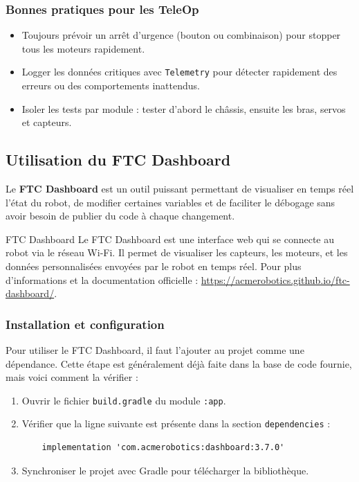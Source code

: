 \documentclass[12pt, a4paper]{report}
\begin{document}
    \subsubsection*{Bonnes pratiques pour les TeleOp}

    \begin{itemize}
        \item Toujours prévoir un arrêt d’urgence (bouton ou combinaison) pour stopper tous les moteurs rapidement.
        \item Logger les données critiques avec \texttt{Telemetry} pour détecter rapidement des erreurs ou des comportements inattendus.
        \item Isoler les tests par module : tester d’abord le châssis, ensuite les bras, servos et capteurs.
    \end{itemize}

    \subsection{Utilisation du FTC Dashboard}

    Le \textbf{FTC Dashboard} est un outil puissant permettant de visualiser en temps réel l'état du robot, de modifier certaines variables et de faciliter le débogage sans avoir besoin de publier du code à chaque changement.

    \begin{mydefinition}{FTC Dashboard}
        Le FTC Dashboard est une interface web qui se connecte au robot via le réseau Wi-Fi. Il permet de visualiser les capteurs, les moteurs, et les données personnalisées envoyées par le robot en temps réel.
        Pour plus d'informations et la documentation officielle : \url{https://acmerobotics.github.io/ftc-dashboard/}.
    \end{mydefinition}

    \subsubsection{Installation et configuration}

    Pour utiliser le FTC Dashboard, il faut l'ajouter au projet comme une dépendance. Cette étape est généralement déjà faite dans la base de code fournie, mais voici comment la vérifier :

    \begin{enumerate}
        \item Ouvrir le fichier \verb|build.gradle| du module \verb|:app|.
        \item Vérifier que la ligne suivante est présente dans la section \verb|dependencies| :
        \begin{verbatim}
    implementation 'com.acmerobotics:dashboard:3.7.0'
        \end{verbatim}
        \item Synchroniser le projet avec Gradle pour télécharger la bibliothèque.
    \end{enumerate}
\end{document}
